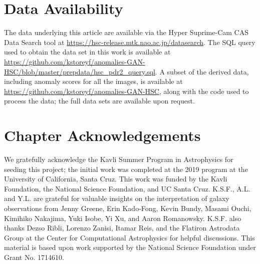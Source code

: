 \section*{Data Availability}

The data underlying this article are available via the Hyper Suprime-Cam CAS Data Search tool at \url{https://hsc-release.mtk.nao.ac.jp/datasearch}.
The SQL query used to obtain the data set in this work is available at \url{https://github.com/kstoreyf/anomalies-GAN-HSC/blob/master/prepdata/hsc_pdr2_query.sql}.
A subset of the derived data, including anomaly scores for all the images, is available at \url{https://github.com/kstoreyf/anomalies-GAN-HSC}, along with the code used to process the data; the full data sets are available upon request.

\section{Chapter Acknowledgements}

We gratefully acknowledge the Kavli Summer Program in Astrophysics for seeding this project; the initial work was completed at the 2019 program at the University of California, Santa Cruz.
This work was funded by the Kavli Foundation, the National Science Foundation, and UC Santa Cruz.
K.S.F., A.L. and Y.L. are grateful for valuable insights on the interpretation of galaxy observations from Jenny Greene, Erin Kado-Fong, Kevin Bundy, Masami Ouchi, Kimihiko Nakajima, Yuki Isobe, Yi Xu, and Aaron Romanowsky.
K.S.F. also thanks Dezso Ribli, Lorenzo Zanisi, Itamar Reis, and the Flatiron Astrodata Group at the Center for Computational Astrophysics for helpful discussions. 
This material is based upon work supported by the National Science Foundation under Grant No. 1714610.



